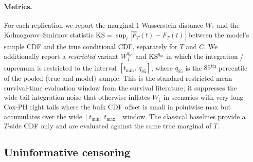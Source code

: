 \paragraph{Metrics.}
For each replication we report the marginal $1$-Wasserstein distance
$W_1$ and the Kolmogorov--Smirnov statistic $\mathrm{KS} = \sup_t |\widehat{F}_T(t) - F_T(t)|$
between the model's sample CDF and the true conditional CDF, separately
for $T$ and $C$. We additionally report a \emph{restricted} variant
$W_1^{q_{85}}$ and $\mathrm{KS}^{q_{85}}$ in which the integration / supremum
is restricted to the interval $[t_{\min},\, q_{85}]$, where $q_{85}$ is the
$85$\textsuperscript{th} percentile of the pooled (true and model) sample.
This is the standard restricted-mean-survival-time evaluation window from
the survival literature; it suppresses the wide-tail integration noise that
otherwise inflates $W_1$ in scenarios with very long Cox-PH right tails
where the bulk CDF offset is small in pointwise max but accumulates over
the wide $[t_{\min},\, t_{\max}]$ window. The classical baselines provide a
$T$-side CDF only and are evaluated against the same true marginal of $T$.

\subsection{Uninformative censoring}
\label{sec:sim-uninf}

